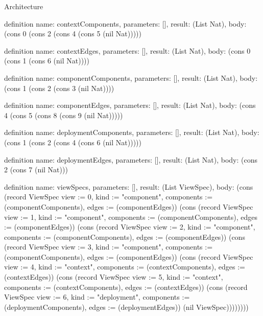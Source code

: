 \begin{lexlean}{Architecture}
\begin{semanticmodule}
definition{
  name: contextComponents,
  parameters: [],
  result: (List Nat),
  body: (cons 0 (cons 2 (cons 4 (cons 5 (nil Nat)))))
}

definition{
  name: contextEdges,
  parameters: [],
  result: (List Nat),
  body: (cons 0 (cons 1 (cons 6 (nil Nat))))
}

definition{
  name: componentComponents,
  parameters: [],
  result: (List Nat),
  body: (cons 1 (cons 2 (cons 3 (nil Nat))))
}

definition{
  name: componentEdges,
  parameters: [],
  result: (List Nat),
  body: (cons 4 (cons 5 (cons 8 (cons 9 (nil Nat)))))
}

definition{
  name: deploymentComponents,
  parameters: [],
  result: (List Nat),
  body: (cons 1 (cons 2 (cons 4 (cons 6 (nil Nat)))))
}

definition{
  name: deploymentEdges,
  parameters: [],
  result: (List Nat),
  body: (cons 2 (cons 7 (nil Nat)))
}

definition{
  name: viewSpecs,
  parameters: [],
  result: (List ViewSpec),
  body: (cons (record ViewSpec {view := 0, kind := "component", components := (componentComponents), edges := (componentEdges)}) (cons (record ViewSpec {view := 1, kind := "component", components := (componentComponents), edges := (componentEdges)}) (cons (record ViewSpec {view := 2, kind := "component", components := (componentComponents), edges := (componentEdges)}) (cons (record ViewSpec {view := 3, kind := "component", components := (componentComponents), edges := (componentEdges)}) (cons (record ViewSpec {view := 4, kind := "context", components := (contextComponents), edges := (contextEdges)}) (cons (record ViewSpec {view := 5, kind := "context", components := (contextComponents), edges := (contextEdges)}) (cons (record ViewSpec {view := 6, kind := "deployment", components := (deploymentComponents), edges := (deploymentEdges)}) (nil ViewSpec))))))))
}


\end{semanticmodule}
\end{lexlean}
